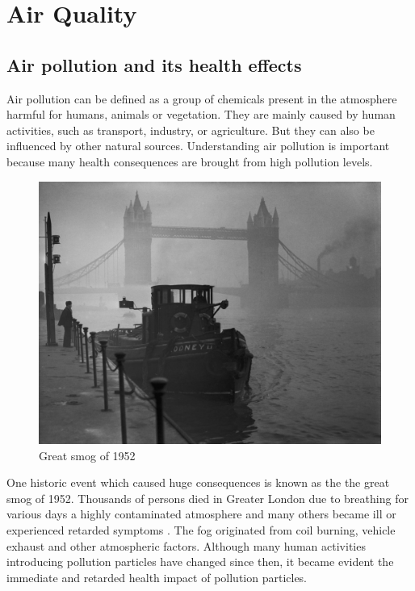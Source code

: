 \section{Air Quality}
\subsection{Air pollution and its health effects}
Air pollution can be defined as a group of chemicals present in the atmosphere harmful for humans, animals or vegetation. They are mainly caused by human activities, such as transport, industry, or agriculture. But they can also be influenced by other natural sources. Understanding air pollution is important because many health consequences are brought from high pollution levels. 
\begin{figure}[h]
  \centering
  \includegraphics[scale=.8]{images/great_smog.jpg}
  \caption[Great smog of 1952]{Great smog of 1952 \cite{ElliotWagland2013}}
  \label{fig:interaction_design}
\end{figure}

One historic event which caused huge consequences is known as the the great smog of 1952. Thousands of persons died in Greater London due to  breathing for various days a highly contaminated atmosphere and many others became ill or experienced retarded symptoms \cite{Bell2008}. The fog originated from coil burning, vehicle exhaust and other atmospheric factors. Although many human activities introducing pollution particles have changed since then, it became evident the immediate and retarded health impact of pollution particles.

